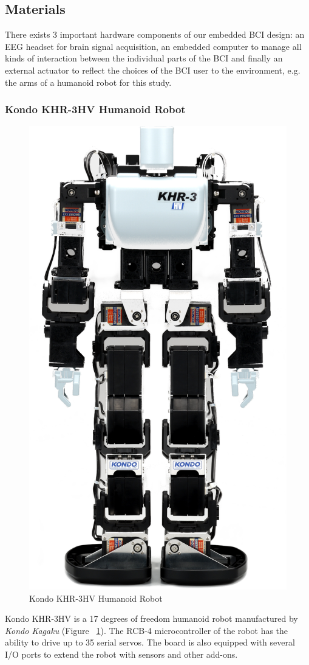 \documentclass[12pt]{article}
\newcommand\mysubsection[1]{\subsection{#1}}
\newcommand\mysubsubsection[1]{\subsubsection{#1}}
\numberwithin{equation}{section}
\numberwithin{figure}{section}
\numberwithin{table}{section}
\begin{document}
\mysubsection{Materials}
\par{
    There exists 3 important hardware components of our embedded BCI
    design: an EEG headset for brain signal acquisition, an embedded
    computer to manage all kinds of interaction between the
    individual parts of the BCI and finally an external actuator to reflect
    the choices of the BCI user to the environment, e.g. the arms of a humanoid robot
    for this study.
}
\mysubsubsection{Kondo KHR-3HV Humanoid Robot}
\par{
    \begin{figure}[ht]
        \centering
        \includegraphics[scale=0.7]{images/kondo}
        \caption{Kondo KHR-3HV Humanoid Robot}
        \label{fig:kondo}
    \end{figure}
    Kondo KHR-3HV is a 17 degrees of freedom humanoid robot manufactured by
    \emph{Kondo Kagaku} (Figure ~\ref{fig:kondo}). The RCB-4 microcontroller of the robot has the
    ability to drive up to 35 serial servos. The board is also equipped with
    several I/O ports to extend the robot with sensors and other add-ons.
}
\end{document}

